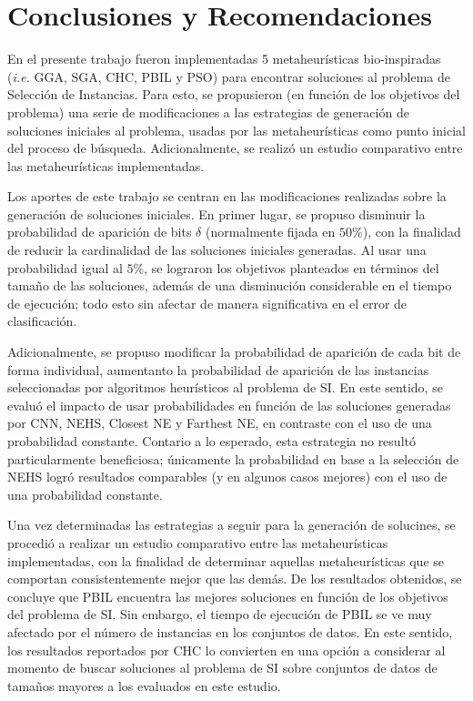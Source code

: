 \chapter*{Conclusiones y Recomendaciones}
\label{conclusiones}

En el presente trabajo fueron implementadas 5 metaheurísticas bio-inspiradas (\emph{i.e.} GGA, SGA, CHC, PBIL y PSO) para encontrar soluciones al problema de Selección de Instancias. Para esto, se propusieron (en función de los objetivos del problema) una serie de modificaciones a las estrategias de generación de soluciones iniciales al problema, usadas por las metaheurísticas como punto inicial del proceso de búsqueda. Adicionalmente, se realizó un estudio comparativo entre las metaheurísticas implementadas.%

Los aportes de este trabajo se centran en las modificaciones realizadas sobre la generación de soluciones iniciales. En primer lugar, se propuso disminuir la probabilidad de aparición de bits $\delta$ (normalmente fijada en $50\%$), con la finalidad de reducir la cardinalidad de las soluciones iniciales generadas. Al usar una probabilidad igual al $5\%$, se lograron los objetivos planteados en términos del tamaño de las soluciones, además de una disminución considerable en el tiempo de ejecución; todo esto sin afectar de manera significativa en el error de clasificación.

Adicionalmente, se propuso modificar la probabilidad de aparición de cada bit de forma individual, aumentanto la probabilidad de aparición de las instancias seleccionadas por algoritmos heurísticos al problema de SI. En este sentido, se evaluó el impacto de usar probabilidades en función de las soluciones generadas por CNN, NEHS, Closest NE y Farthest NE, en contraste con el uso de una probabilidad constante. Contario a lo esperado, esta estrategia no resultó particularmente beneficiosa; únicamente la probabilidad en base a la selección de NEHS logró resultados comparables (y en algunos casos mejores) con el uso de una probabilidad constante.

Una vez determinadas las estrategias a seguir para la generación de solucines, se procedió a realizar un estudio comparativo entre las metaheurísticas implementadas, con la finalidad de determinar aquellas metaheurísticas que se comportan consistentemente mejor que las demás. De los resultados obtenidos, se concluye que PBIL encuentra las mejores soluciones en función de los objetivos del problema de SI. Sin embargo, el tiempo de ejecución de PBIL se ve muy afectado por el número de instancias en los conjuntos de datos. En este sentido, los resultados reportados por CHC lo convierten en una opción a considerar al momento de buscar soluciones al problema de SI sobre conjuntos de datos de tamaños mayores a los evaluados en este estudio.

